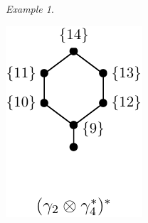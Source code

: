 \documentclass[12pt]{article}
\theoremstyle{definition}
\theoremstyle{remark}
\newtheorem{exm}{Example}
\begin{document}
\begin{exm}
\begin{center}
\begin{minipage}[b]{0.3\textwidth}
\end{minipage}
\begin{minipage}[b]{0.3\textwidth}
\centering
\includegraphics[scale=0.9]{product3.pdf}
\end{minipage}
\end{center}


\end{exm}
\end{document}
